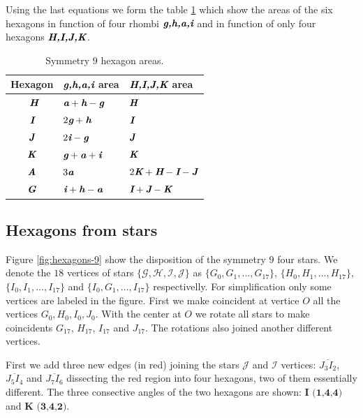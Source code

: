 \documentclass[11pt]{article}
\def\mathbi#1{\textbf{\em #1}}
\begin{document}
Using the last equations we form the table \ref{tbl:hexagons-areas} which show the areas of the six hexagons in function of four rhombi $\mathbi{g,h,a,i}$ and in function of only four hexagons $\mathbi{H,I,J,K}$.

\begin{table}[H]
\begin{center}
\begin{tabular}{| c | l | l |}
\hline
Hexagon & $\mathbi{g,h,a,i}$ area & $\mathbi{H,I,J,K}$ area \\ \hline\
$\mathbi{H}$ & $\mathbi{a} + \mathbi{h} - \mathbi{g}$ & $\mathbi{H}$ \\[0.5ex]
$\mathbi{I}$ & $2\mathbi{g} + \mathbi{h}$ & $\mathbi{I}$ \\[0.5ex]
$\mathbi{J}$ & $2\mathbi{i} - \mathbi{g}$ & $\mathbi{J}$ \\[0.5ex]
$\mathbi{K}$ & $\mathbi{g} + \mathbi{a} + \mathbi{i}$ & $\mathbi{K}$ \\[0.5ex]
\hline
$\mathbi{A}$ & $3\mathbi{a}$ & $2\mathbi{K} + \mathbi{H} - \mathbi{I} - \mathbi{J}$ \\[0.5ex]
$\mathbi{G}$ & $\mathbi{i} + \mathbi{h} - \mathbi{a}$ & $\mathbi{I} + \mathbi{J} - \mathbi{K}$ \\[0.5ex]
\hline
\end{tabular}
\caption{Symmetry $9$ hexagon areas.} 
\label{tbl:hexagons-areas}
\end{center}
\end{table}


\subsection{Hexagons from stars}

Figure \ref{fig:hexagons-9} show the disposition of the symmetry $9$ four stars. We denote the $18$ vertices of stars $\{\mathcal{G},\mathcal{H},\mathcal{I},\mathcal{J}\}$ as
 $\{G_0,G_1,...,G_{17}\}$,
 $\{H_0,H_1,...,H_{17}\}$,
 $\{I_0,I_1,...,I_{17}\}$ and
 $\{I_0,G_1,...,I_{17}\}$ respectivelly. 
For simplification only some vertices are labeled in the figure. First we make coincident at vertice $O$ all the vertices $G_0,H_0,I_0,J_0$. With the center at $O$ we rotate all stars to make coincidents
$G_{17}$, $H_{17}$, $I_{17}$ and $J_{17}$. The rotations also joined another different vertices.

First we add three new edges (in red) joining the stars $\mathcal{J}$ and $\mathcal{I}$ vertices: $\overline{J_3I_2}$, $\overline{J_5I_4}$ and $\overline{J_7I_6}$ dissecting the red region into four hexagons, two of them essentially different. The three consective angles of the two hexagons are shown: $\textbf{I (1,4,4)}$ and $\textbf{K (3,4,2)}$.
\end{document}
